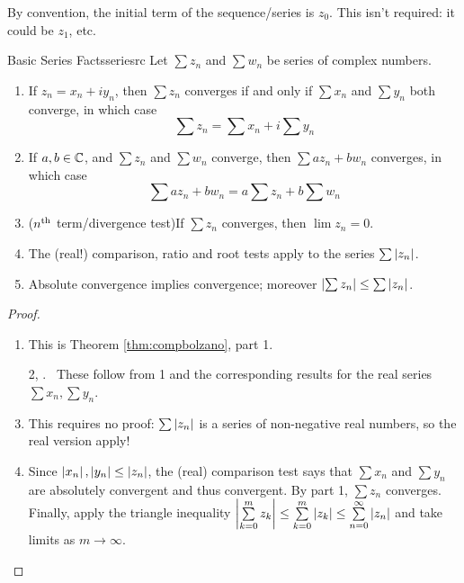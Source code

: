 By convention, the initial term of the sequence/series is $z_0$. This isn't required: it could be $z_1$, etc.

\begin{thm}{Basic Series Facts}{seriesrc}
	Let $\sum z_n$ and $\sum w_n$ be series of complex numbers.
	\begin{enumerate}\itemsep0pt
	  \item If $z_n=x_n+iy_n$, then $\sum z_n$ converges if and only if $\sum x_n$ and $\sum y_n$ both converge, in which case
	  \[
	  	\sum z_n=\sum x_n+i\sum y_n
	  \]
	  \item\vspace{-3pt} If $a,b\in\mathbb{C}$, and $\sum z_n$ and $\sum w_n$ converge, then $\sum az_n+bw_n$ converges, in which case
	  \[
	  	\sum az_n+bw_n=a\sum z_n+b\sum w_n
	  \]
	  \item\vspace{-3pt} ($n\textsuperscript{th}$ term/divergence test)\lstsp If $\sum z_n$ converges, then $\lim z_n=0$.
	  \item The (real!) comparison, ratio and root tests apply to the series $\sum\left| z_n\right|$.
	  \item Absolute convergence implies convergence; moreover $\left| \sum z_n\right|\le\sum\left| z_n\right|$.
	\end{enumerate}
\end{thm}

\begin{proof}
	\begin{enumerate}\itemsep0pt
	  \item This is Theorem \ref{thm:compbolzano}, part 1.
	  \item[2,]. \ These follow from 1 and the corresponding results for the real series $\sum x_n,\sum y_n$.
	  \setcounter{enumi}{3}
	  \item This requires no proof: $\sum \left| z_n\right|$ is a series of non-negative real numbers, so the real version apply!
	  \item Since $\left| x_n\right|,\left| y_n\right|\le\left| z_n\right|$, the (real) comparison test says that $\sum x_n$ and $\sum y_n$ are absolutely convergent and thus convergent. By part 1, $\sum z_n$ converges. Finally, apply the triangle inequality $\left| \sum\limits_{k=0}^m z_k\right|\le\sum\limits_{k=0}^m\left| z_k\right|\le\sum\limits_{n=0}^\infty\left| z_n\right|$ and take limits as $m\to\infty$.\qedhere
	\end{enumerate}
\end{proof}

